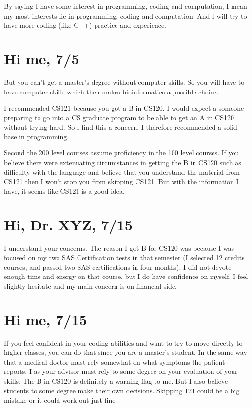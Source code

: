 \documentclass[12pt]{book}
\begin{document}
By saying I have some interest in programming, coding and computation, I mean my most interests lie in programming, coding and computation. And I will try to have more coding (like C++) practice and experience.


\section{Hi me,   7/5}
\label{sec-2-6}

But you can't get a master's degree without computer skills. So you will have to have computer skills which then makes bioinformatics a possible choice.

I recommended CS121 because you got a B in CS120. I would expect a someone preparing to go into a CS graduate program to be able to get an A in CS120 without trying hard. So I find this a concern. I therefore recommended a solid base in programming.   

Second the 200 level courses assume proficiency in the 100 level courses. If you believe there were extenuating circumstances in getting the B in CS120 such as difficulty with the language and believe that you understand the material from CS121 then I won't stop you from skipping CS121. But with the information I have, it seems like CS121 is a good idea.


\section{Hi, Dr. XYZ,  7/15}
\label{sec-2-7}

I understand your concerns. The reason I got B for CS120 was because I was focused on my two SAS Certification tests in that semester (I selected 12 credits courses, and passed two SAS certifications in four months). I did not devote enough time and energy on that course, but I do have confidence on myself. I feel slightly hesitate and my main concern is on financial side.


\section{Hi me,   7/15}
\label{sec-2-8}

If you feel confident in your coding abilities and want to try to move directly to higher classes, you can do that since you are a master's student.  In the same way that a medical doctor must rely somewhat on what symptoms the patient reports, I as your advisor must rely to some degree on your evaluation of your skills.   The B in CS120 is definitely a warning flag to me.   But I also believe students to some degree make their own decisions.   Skipping 121 could be a big mistake or it could work out just fine.
\end{document}
